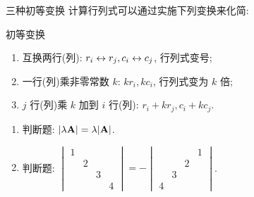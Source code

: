 \begin{frame}{三种初等变换}
	\onslide<+->
	计算行列式可以通过实施下列变换来化简:
	\onslide<+->
	\begin{block}{初等变换}
		\begin{enumerate}
			\item 互换两行(列): \alert{$r_i\leftrightarrow r_j, c_i\leftrightarrow c_j$}, 行列式变号;
			\item 一行(列)乘\alert{非零常数} $k$: \alert{$kr_i, kc_i$}, 行列式变为 $k$ 倍;
			\item $j$ 行(列)乘 $k$ 加到 $i$ 行(列): \alert{$r_i+kr_j, c_i+kc_j$}.
		\end{enumerate}
	\end{block}
	\onslide<+->
	\begin{exercise}
		\begin{enumerate}
			\item 判断题: $|\lambda {\mathbf{A}}|=\lambda|{\mathbf{A}}|$. \visible<+->{\alert{$|\lambda \bfA|=\lambda^n|\bfA|$}}
			\item 判断题: $\begin{vmatrix}
				1&&&\\&2&&\\&&3&\\&&&4
			\end{vmatrix}=-\begin{vmatrix}
				&&&1\\&&2&\\&3&&\\4&&&
			\end{vmatrix}$. \visible<+->{\Huge\alert{$\times$}}
		\end{enumerate}
	\end{exercise}
\end{frame}



